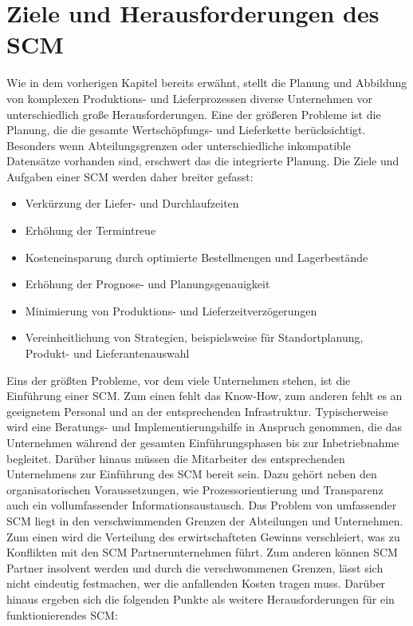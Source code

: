 \section{Ziele und Herausforderungen des SCM}
Wie in dem vorherigen Kapitel bereits erwähnt, stellt die Planung und Abbildung von komplexen Produktions- und Lieferprozessen diverse Unternehmen vor unterschiedlich große Herausforderungen. Eine der größeren Probleme ist die Planung, die die gesamte Wertschöpfungs- und Lieferkette berücksichtigt. Besonders wenn Abteilungsgrenzen oder unterschiedliche inkompatible Datensätze vorhanden sind, erschwert das die integrierte Planung.
Die Ziele und Aufgaben einer \ac{SCM} werden daher breiter gefasst:
\begin{itemize}
	\item Verkürzung der Liefer- und Durchlaufzeiten
	\item Erhöhung der Termintreue
	\item Kosteneinsparung durch optimierte Bestellmengen und Lagerbestände
	\item Erhöhung der Prognose- und Planungsgenauigkeit
	\item Minimierung von Produktions- und Lieferzeitverzögerungen
	\item Vereinheitlichung von Strategien, beispielsweise für Standortplanung, Produkt- und Lieferantenauswahl
\end{itemize}
Eins der größten Probleme, vor dem viele Unternehmen stehen, ist die Einführung einer \ac{SCM}. Zum einen fehlt das Know-How, zum anderen fehlt es an geeignetem Personal und an der entsprechenden Infrastruktur. Typischerweise wird eine Beratungs- und Implementierungshilfe in Anspruch genommen, die das Unternehmen während der gesamten Einführungsphasen bis zur Inbetriebnahme begleitet. Darüber hinaus müssen die Mitarbeiter des entsprechenden Unternehmens zur Einführung des \ac{SCM} bereit sein. Dazu gehört neben den organisatorischen Voraussetzungen, wie Prozessorientierung und Transparenz auch ein vollumfassender Informationsaustausch.
Das Problem von umfassender \ac{SCM} liegt in den verschwimmenden Grenzen der Abteilungen und Unternehmen. Zum einen wird die Verteilung des erwirtschafteten Gewinns verschleiert, was zu Konflikten mit den \ac{SCM} Partnerunternehmen führt. Zum anderen können \ac{SCM} Partner insolvent werden und durch die verschwommenen Grenzen, lässt sich nicht eindeutig festmachen, wer die anfallenden Kosten tragen muss. Darüber hinaus ergeben sich die folgenden Punkte als weitere Herausforderungen für ein funktionierendes \ac{SCM}:
